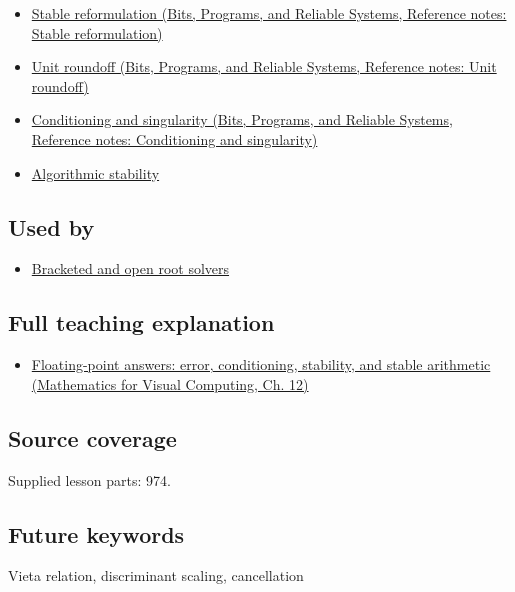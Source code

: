 \begin{itemize}
\tightlist
\item
  \href{../01-Bits-Programs-and-Reliable-Systems/main.pdf\#nameddest=appendix-d7f8ba961670}{Stable reformulation (Bits, Programs, and Reliable Systems, Reference notes: Stable reformulation)}
\item
  \href{../01-Bits-Programs-and-Reliable-Systems/main.pdf\#nameddest=appendix-bc44f7b42f42}{Unit roundoff (Bits, Programs, and Reliable Systems, Reference notes: Unit roundoff)}
\item
  \href{../01-Bits-Programs-and-Reliable-Systems/main.pdf\#nameddest=appendix-8f6a01f284a7}{Conditioning and singularity (Bits, Programs, and Reliable Systems, Reference notes: Conditioning and singularity)}
\item
  \hyperref[appendix-aa2bf0d79639]{Algorithmic stability}
\end{itemize}

\subsection{Used by}\label{appendix-b9afba7f63e5-used-by}

\hypertarget{appendix-b9afba7f63e5-used-by}{}

\begin{itemize}
\tightlist
\item
  \hyperref[appendix-f63eb850796d]{Bracketed and open root solvers}
\end{itemize}

\subsection{Full teaching explanation}\label{appendix-b9afba7f63e5-full-teaching-explanation}

\hypertarget{appendix-b9afba7f63e5-full-teaching-explanation}{}

\begin{itemize}
\tightlist
\item
  \href{../02-Mathematics-for-Visual-Computing/main.pdf\#nameddest=02-foundations-ii-ch028-floating-point-answers-error-conditioning-stability-and-stable-arithmetic}{Floating-point answers: error, conditioning, stability, and stable arithmetic (Mathematics for Visual Computing, Ch. 12)}
\end{itemize}

\subsection{Source coverage}\label{appendix-b9afba7f63e5-source-coverage}

\hypertarget{appendix-b9afba7f63e5-source-coverage}{}

Supplied lesson parts: 974.

\subsection{Future keywords}\label{appendix-b9afba7f63e5-future-keywords}

\hypertarget{appendix-b9afba7f63e5-future-keywords}{}

Vieta relation, discriminant scaling, cancellation
